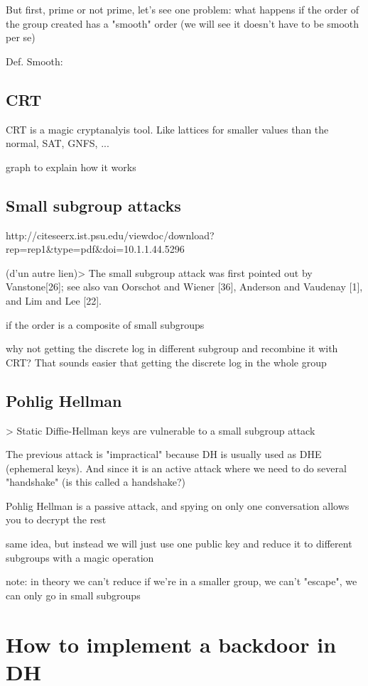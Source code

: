 \documentclass[a4paper,11pt]{article}
\begin{document}
But first, prime or not prime, let's see one problem: what happens if the order of the group created has a "smooth" order (we will see it doesn't have to be smooth per se)

Def. Smooth:

\subsection{CRT}

CRT is a magic cryptanalyis tool. Like lattices for smaller values than the normal, SAT, GNFS, ...

graph to explain how it works

\subsection{Small subgroup attacks}

http://citeseerx.ist.psu.edu/viewdoc/download?rep=rep1&type=pdf&doi=10.1.1.44.5296

(d'un autre lien)> The small subgroup attack was first pointed out by Vanstone[26]; see also van Oorschot and Wiener [36], Anderson and Vaudenay [1], and Lim and Lee [22].

if the order is a composite of small subgroups

why not getting the discrete log in different subgroup and recombine it with CRT? That sounds easier that getting the discrete log in the whole group

\subsection{Pohlig Hellman}

> Static Diffie-Hellman keys are vulnerable to a small subgroup attack

The previous attack is "impractical" because DH is usually used as DHE (ephemeral keys). And since it is an active attack where we need to do several "handshake" (is this called a handshake?)

Pohlig Hellman is a passive attack, and spying on only one conversation allows you to decrypt the rest

same idea, but instead we will just use one public key and reduce it to different subgroups with a magic operation

note: in theory we can't reduce if we're in a smaller group, we can't "escape", we can only go in small subgroups

\section{How to implement a backdoor in DH}
\end{document}
